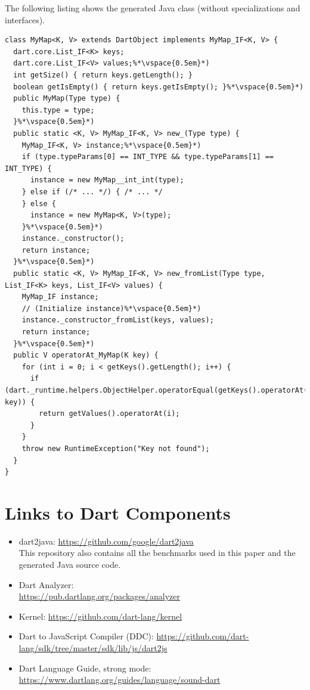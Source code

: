 \documentclass[sigplan]{acmart}
\begin{document}
The following listing shows the generated Java class (without specializations and interfaces).

\begin{mdframed}[outerlinewidth=0.1pt,outerlinecolor=black,skipabove=4pt,
  innerleftmargin=5pt,innerrightmargin=0pt,innertopmargin=0pt,innerbottommargin=0pt]
\begin{lstlisting}[basicstyle=\scriptsize\ttfamily]
class MyMap<K, V> extends DartObject implements MyMap_IF<K, V> {
  dart.core.List_IF<K> keys;
  dart.core.List_IF<V> values;%*\vspace{0.5em}*)
  int getSize() { return keys.getLength(); }
  boolean getIsEmpty() { return keys.getIsEmpty(); }%*\vspace{0.5em}*)
  public MyMap(Type type) {
    this.type = type;
  }%*\vspace{0.5em}*)
  public static <K, V> MyMap_IF<K, V> new_(Type type) {
  	MyMap_IF<K, V> instance;%*\vspace{0.5em}*)
    if (type.typeParams[0] == INT_TYPE && type.typeParams[1] == INT_TYPE) {
      instance = new MyMap__int_int(type);
    } else if (/* ... */) { /* ... */
    } else {
      instance = new MyMap<K, V>(type);
    }%*\vspace{0.5em}*)
    instance._constructor();
    return instance;
  }%*\vspace{0.5em}*)
  public static <K, V> MyMap_IF<K, V> new_fromList(Type type, List_IF<K> keys, List_IF<V> values) {
  	MyMap_IF instance;
    // (Initialize instance)%*\vspace{0.5em}*)
    instance._constructor_fromList(keys, values);
    return instance;
  }%*\vspace{0.5em}*)
  public V operatorAt_MyMap(K key) {
    for (int i = 0; i < getKeys().getLength(); i++) {
      if (dart._runtime.helpers.ObjectHelper.operatorEqual(getKeys().operatorAt(i), key)) {
        return getValues().operatorAt(i);
      }
    }
    throw new RuntimeException("Key not found");
  }
}
\end{lstlisting}
\end{mdframed}

\section{Links to Dart Components}
\begin{itemize}
	\item dart2java: \url{https://github.com/google/dart2java} \\
    This repository also contains all the benchmarks used in this paper and the generated Java source code.
	\item Dart Analyzer:\\ \url{https://pub.dartlang.org/packages/analyzer}
    \item Kernel: \url{https://github.com/dart-lang/kernel}
    \item Dart to JavaScript Compiler (DDC): \url{https://github.com/dart-lang/sdk/tree/master/sdk/lib/js/dart2js}
    \item Dart Language Guide, strong mode: \\ \url{https://www.dartlang.org/guides/language/sound-dart}
\end{itemize}
\end{document}
